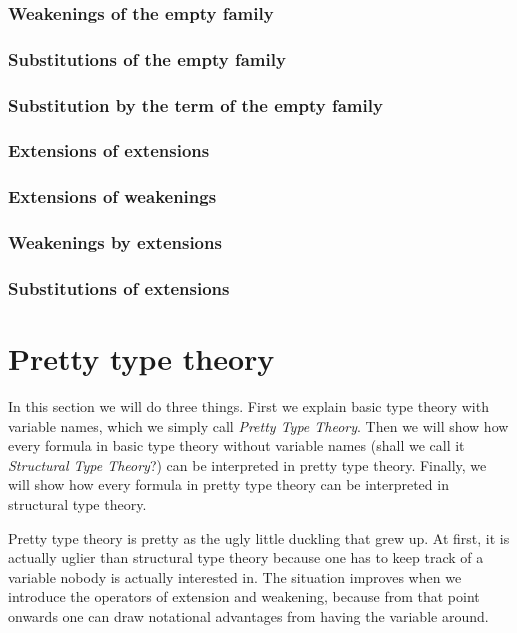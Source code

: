 \subsubsection{Weakenings of the empty family}

\subsubsection{Substitutions of the empty family}

\subsubsection{Substitution by the term of the empty family}

\subsubsection{Extensions of extensions}

\subsubsection{Extensions of weakenings}

\subsubsection{Weakenings by extensions}

\subsubsection{Substitutions of extensions}

\section{Pretty type theory}
In this section we will do three things. First we explain basic type theory with
variable names, which we simply call \emph{Pretty Type Theory}. 
Then we will show how every formula in basic type theory without
variable names (shall we call it \emph{Structural Type Theory}?) 
can be interpreted in pretty type theory. Finally, we will show how every formula
in pretty type theory can be interpreted in structural type theory.

Pretty type theory is pretty as the ugly little duckling that grew up. At first, it is actually uglier than
structural type theory because one has to keep track of a variable nobody is
actually interested in. The situation improves when we introduce the operators
of extension and weakening, because from that point onwards one can draw notational
advantages from having the variable around.

